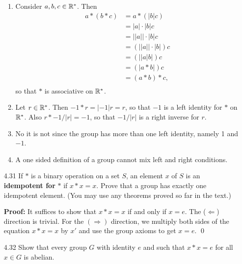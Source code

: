 \begin{enumerate}
      \begin{enumerate}
         \item Consider $a, b, c \in \mathbb{R}^*$. Then
               \begin{align*}
                  a * (b * c) &= a * (|b|c)           \\
                              &= |a| \cdot |b|c       \\
                              &= ||a|| \cdot |b|c     \\
                              &= (||a|| \cdot |b|)c   \\
                              &= (||a|b|)c            \\
                              &= (|a * b|)c           \\
                              &= (a * b) * c,         \\
               \end{align*}
               so that $*$ is associative on $\mathbb{R}^*$.
         \item Let $r \in \mathbb{R}^*$. Then $-1 * r = |-1|r = r$, so that $-1$ is a 
               left identity for $*$ on $\mathbb{R}^*$. Also $r * -1/|r| = -1$, so that
               $-1/|r|$ is a right inverse for $r$.
         \item No it is not since the group has more than one left identity,
               namely 1 and $-1$.
         \item A one sided definition of a group cannot mix left and right 
               conditions.
      \end{enumerate}
   \item[4.31] If $*$ is a binary operation on a set $S$, an element $x$ of $S$
               is an \textbf{idempotent for} $*$ if $x * x = x$. Prove that a
               group has exactly one idempotent element. (You may use any
               theorems proved so far in the text.)

      \textbf{Proof:} It suffices to show that $x * x = x$ if and only if
      $x = e$. The ($\Leftarrow$) direction is trivial. For the
      $(\Rightarrow)$ direction, we multiply both sides of the equation
      $x * x = x$ by $x'$ and use the group axioms to get $x = e$. \qed
   \item[4.32] Show that every group $G$ with identity $e$ and such that
               $x * x = e$ for all $x \in G$ is abelian.


\end{enumerate}
